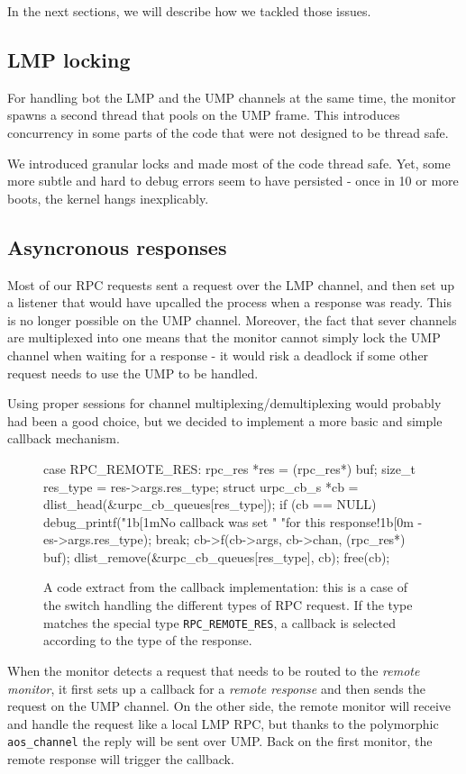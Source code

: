 \documentclass[a4paper,twoside,openright]{report}
\begin{document}
In the next sections, we will describe how we tackled those issues.

\subsection{LMP locking}
For handling bot the LMP and the UMP channels at the same time, the monitor spawns a second thread that pools on the UMP frame. This introduces concurrency in some parts of the code that were not designed to be thread safe.

We introduced granular locks and made most of the code thread safe.
Yet, some more subtle and hard to debug errors seem to have persisted - once in 10 or more boots, the kernel hangs inexplicably.

\subsection{Asyncronous responses}

Most of our RPC requests sent a request over the LMP channel, and then set up a listener that would have upcalled the process when a response was ready. This is no longer possible on the UMP channel. Moreover, the fact that sever channels are multiplexed into one means that the monitor cannot simply lock the UMP channel when waiting for a response - it would risk a deadlock if some other request needs to use the UMP to be handled.
 
Using proper sessions for channel multiplexing/demultiplexing would probably had been a good choice, but we decided to implement a more basic and simple callback mechanism.
\begin{figure} [H]
	\begin{pandacode}
case RPC_REMOTE_RES:
	rpc_res *res = (rpc_res*) buf;
	size_t res_type = res->args.res_type;
	struct urpc_cb_s *cb = dlist_head(&urpc_cb_queues[res_type]);
	if (cb == NULL) 
	debug_printf("\x1b[1mNo callback was set "
	"for this response!\x1b[0m - %
	es->args.res_type);
	break;
	cb->f(cb->args, cb->chan, (rpc_res*) buf);
	dlist_remove(&urpc_cb_queues[res_type], cb);
	free(cb);
	\end{pandacode}
	\caption{A code extract from the callback implementation: this is a case of the switch handling the different types of RPC request. If the type matches the special type \texttt{RPC\_REMOTE\_RES}, a callback is selected according to the type of the response.}
\end{figure}
When the monitor detects a request that needs to be routed to the \emph{remote monitor}, it first sets up a callback for a \emph{remote response} and then sends the request on the UMP channel. On the other side, the remote monitor will receive and handle the request like a local LMP RPC, but thanks to the polymorphic \texttt{aos\_channel} the reply will be sent over UMP. Back on the first monitor, the remote response will trigger the callback.
\end{document}
